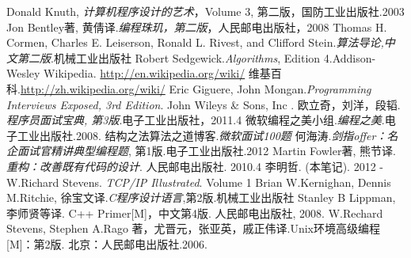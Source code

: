 

\begin{thebibliography}{99}

    Donald Knuth, \emph{计算机程序设计的艺术}，Volume 3, 第二版，国防工业出版社.2003
    Jon Bentley著, 黄倩译.\emph{编程珠玑，第二版}，人民邮电出版社，2008
    Thomas H. Cormen, Charles E. Leiserson, Ronald L. Rivest, and Clifford Stein.\emph{算法导论,中文第二版}.机械工业出版社
    Robert Sedgewick.\emph{Algorithms}, Edition 4.Addison-Wesley
    Wikipedia. \url{http://en.wikipedia.org/wiki/}
    维基百科.\url{http://zh.wikipedia.org/wiki/}
     Eric Giguere, John Mongan.\emph{Programming Interviews Exposed, 3rd Edition}. John Wileys \& Sons, Inc .
     欧立奇，刘洋，段韬.\emph{程序员面试宝典, 第3版}.电子工业出版社，2011.4 
     微软编程之美小组.\emph{编程之美}.电子工业出版社.2008.
    结构之法算法之道博客.\emph{微软面试100题}
    何海涛.\emph{剑指offer：名企面试官精讲典型编程题}, 第1版.电子工业出版社.2012
    Martin Fowler著, 熊节译. \emph{重构：改善既有代码的设计}. 人民邮电出版社. 2010.4
    李明哲. \emph{\bookname} (本笔记). 2012 - \number\year 
    W.Richard Stevens. \emph{TCP/IP Illustrated}. Volume 1
    Brian W.Kernighan, Dennis M.Ritchie, 徐宝文译.\emph{C程序设计语言},第2版.机械工业出版社
     Stanley B Lippman, 李师贤等译. C++ Primer[M]，中文第4版. 人民邮电出版社, 2008.
     W.Rechard Stevens, Stephen A.Rago 著，尤晋元，张亚英，戚正伟译.Unix环境高级编程[M]：第2版. 北京：人民邮电出版社.2006.

\end{thebibliography}






